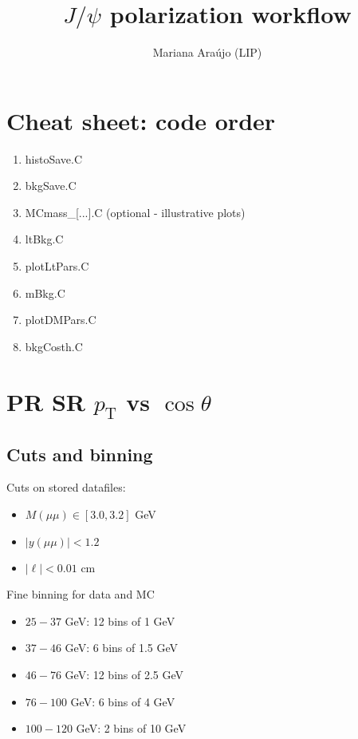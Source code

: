 \documentclass{article}
\newcommand{\pt}{p_\text{T}}
\newcommand{\cost}{\cos\theta}
\begin{document}
\title{$J/\psi$ polarization workflow }
\author{Mariana Ara\'ujo (LIP)}
\maketitle

\tableofcontents

\section{Cheat sheet: code order}

\begin{enumerate}
\item histoSave.C
\item bkgSave.C
\item MCmass\_[...].C (optional - illustrative plots)
\item ltBkg.C
\item plotLtPars.C
\item mBkg.C
\item plotDMPars.C
\item bkgCosth.C
\end{enumerate}

\pagebreak

\section{PR SR $\pt$ vs $\cost$}
\subsection{Cuts and binning} 

Cuts on stored datafiles:
\begin{itemize}
\item $M(\mu\mu)\in[3.0,3.2]$ GeV
\item $|y(\mu\mu)|<1.2$
\item $|\ell|<0.01$ cm
\end{itemize}

Fine binning for data and MC
\begin{itemize}
\item $25-37$ GeV: 12 bins of 1 GeV
\item $37-46$ GeV: 6 bins of 1.5 GeV
\item $46-76$ GeV: 12 bins of 2.5 GeV
\item $76-100$ GeV: 6 bins of 4 GeV
\item $100-120$ GeV: 2 bins of 10 GeV
\end{itemize}
\end{document}
